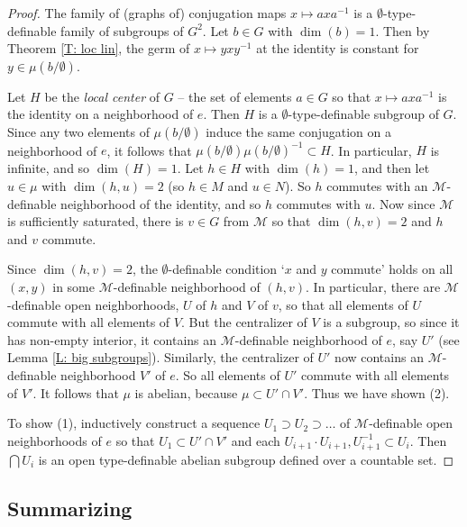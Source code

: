 \documentclass{amsart}
\theoremstyle{definition}
\begin{document}
\begin{proof}
    The family of (graphs of) conjugation maps $x\mapsto axa^{-1}$ is a $\emptyset$-type-definable family of subgroups of $G^2$. Let $b\in G$ with $\dim(b)=1$. Then by Theorem \ref{T: loc lin}, the germ of $x\mapsto yxy^{-1}$ at the identity is constant for $y\in\mu(b/\emptyset)$.
    
    Let $H$ be the \textit{local center} of $G$ -- the set of elements $a\in G$ so that $x\mapsto axa^{-1}$ is the identity on a neighborhood of $e$. Then $H$ is a $\emptyset$-type-definable subgroup of $G$. Since any two elements of $\mu(b/\emptyset)$ induce the same conjugation on a neighborhood of $e$, it follows that $\mu(b/\emptyset)\mu(b/\emptyset)^{-1}\subset H$. In particular, $H$ is infinite, and so $\dim(H)=1$. Let $h\in H$ with $\dim(h)=1$, and then let $u\in\mu$ with $\dim(h,u)=2$ (so $h\in M$ and $u\in N$). So $h$ commutes with an $\mathcal M$-definable neighborhood of the identity, and so $h$ commutes with $u$. Now since $\mathcal M$ is sufficiently saturated, there is $v\in G$ from $\mathcal M$ so that $\dim(h,v)=2$ and $h$ and $v$ commute. 
    
    Since $\dim(h,v)=2$, the $\emptyset$-definable condition `$x$ and $y$ commute' holds on all $(x,y)$ in some $\mathcal M$-definable neighborhood of $(h,v)$. In particular, there are $\mathcal M$-definable open neighborhoods, $U$ of $h$ and $V$ of $v$, so that all elements of $U$ commute with all elements of $V$. But the centralizer of $V$ is a subgroup, so since it has non-empty interior, it contains an $\mathcal M$-definable neighborhood of $e$, say $U'$ (see Lemma \ref{L: big subgroups}). Similarly, the centralizer of $U'$ now contains an $\mathcal M$-definable neighborhood $V'$ of $e$. So all elements of $U'$ commute with all elements of $V'$. It follows that $\mu$ is abelian, because $\mu\subset U'\cap V'$. Thus we have shown (2).

    To show (1), inductively construct a sequence $U_1\supset U_2\supset\dots$ of $\mathcal M$-definable open neighborhoods of $e$ so that $U_1\subset U'\cap V'$ and each $U_{i+1}\cdot U_{i+1},U_{i+1}^{-1}\subset U_i$. Then $\bigcap U_i$ is an open type-definable abelian subgroup defined over a countable set. 
\end{proof}

\subsection{Summarizing}
\end{document}
